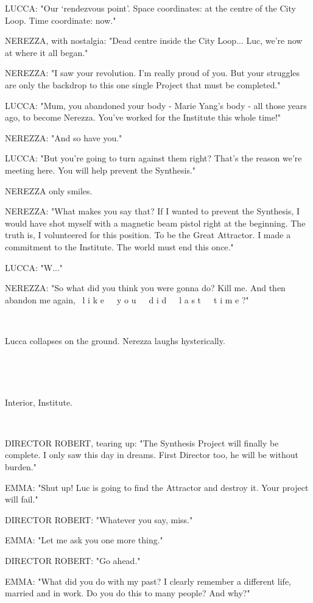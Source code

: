 \documentclass[11pt]{article}
\begin{document}
LUCCA: "Our `rendezvous point'.
Space coordinates: at the centre of the City Loop. 
Time coordinate: now."

NEREZZA, with nostalgia: "Dead centre inside the City Loop...
Luc, we're now at where it all began."

NEREZZA: "I saw your revolution. 
I'm really proud of you.
But your struggles are only the backdrop to this one single Project that must be completed."

LUCCA: "Mum, you abandoned your body - Marie Yang's body - all those years ago, to become Nerezza.
You've worked for the Institute this whole time!"

NEREZZA: "And so have you."

LUCCA: "But you're going to turn against them right?
That's the reason we're meeting here.
You will help prevent the Synthesis."

NEREZZA only smiles.

NEREZZA: "What makes you say that?
If I wanted to prevent the Synthesis, I would have shot myself with a magnetic beam pistol right at the beginning.
The truth is, I volunteered for this position.
To be the Great Attractor.
I made a commitment to the Institute.
The world must end this once."

LUCCA: "W..."

NEREZZA: "So what did you think you were gonna do?
Kill me.
And then abandon me again,  \ 
l i k e\ \ \ y o u\ \ \ d i d\ \ \ l a s t\ \ \ t i m e ?"

\ 

Lucca collapses on the ground. 
Nerezza laughs hysterically.

\ 

\ 

Interior, Institute.

\ 

DIRECTOR ROBERT, tearing up: "The Synthesis Project will finally be complete.
I only saw this day in dreams.
First Director too, he will be without burden."

EMMA: "Shut up! Luc is going to find the Attractor and destroy it.
Your project will fail."

DIRECTOR ROBERT: "Whatever you say, miss."

EMMA: "Let me ask you one more thing."

DIRECTOR ROBERT: "Go ahead."

EMMA: "What did you do with my past?
I clearly remember a different life, married and in work.
Do you do this to many people?
And why?"
\end{document}
